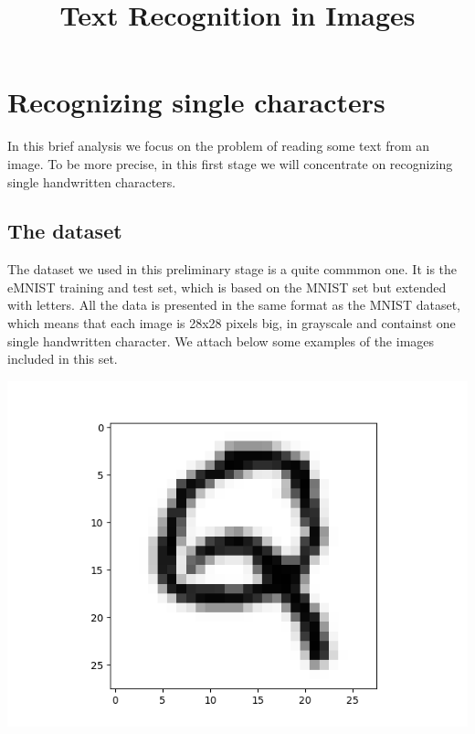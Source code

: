 \documentclass[11pt]{article}
\title{Text Recognition in Images}
\makeatletter
\def\maxwidth{\ifdim\Gin@nat@width>\linewidth\linewidth
    \else\Gin@nat@width\fi}
\let\Oldincludegraphics\includegraphics
\renewcommand{\includegraphics}[1]{\Oldincludegraphics[width=.8\maxwidth]{#1}}
\makeatother
\begin{document}
    
    
    \maketitle
    
    

    
    \hypertarget{recognizing-single-characters}{%
\section{Recognizing single
characters}\label{recognizing-single-characters}}

In this brief analysis we focus on the problem of reading some text from
an image. To be more precise, in this first stage we will concentrate on
recognizing single handwritten characters.

\hypertarget{the-dataset}{%
\subsection{The dataset}\label{the-dataset}}

The dataset we used in this preliminary stage is a quite commmon one. It
is the eMNIST training and test set, which is based on the MNIST set but
extended with letters. All the data is presented in the same format as
the MNIST dataset, which means that each image is 28x28 pixels big, in
grayscale and containst one single handwritten character. We attach
below some examples of the images included in this set.

\includegraphics{imgs/B1.png}
\end{document}
